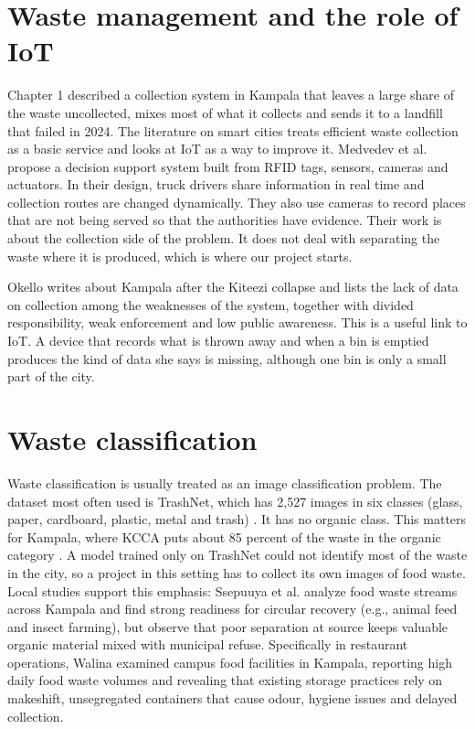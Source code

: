 \documentclass[12pt,a4paper]{report}
\begin{document}
\section{Waste management and the role of IoT}

Chapter 1 described a collection system in Kampala that leaves a large share of the waste uncollected, mixes most of what it collects and sends it to a landfill that failed in 2024. The literature on smart cities treats efficient waste collection as a basic service and looks at IoT as a way to improve it. Medvedev et al. \cite{medvedev} propose a decision support system built from RFID tags, sensors, cameras and actuators. In their design, truck drivers share information in real time and collection routes are changed dynamically. They also use cameras to record places that are not being served so that the authorities have evidence. Their work is about the collection side of the problem. It does not deal with separating the waste where it is produced, which is where our project starts.

Okello \cite{okello} writes about Kampala after the Kiteezi collapse and lists the lack of data on collection among the weaknesses of the system, together with divided responsibility, weak enforcement and low public awareness. This is a useful link to IoT. A device that records what is thrown away and when a bin is emptied produces the kind of data she says is missing, although one bin is only a small part of the city.

\section{Waste classification}

Waste classification is usually treated as an image classification problem. The dataset most often used is TrashNet, which has 2,527 images in six classes (glass, paper, cardboard, plastic, metal and trash) \cite{yang,white}. It has no organic class. This matters for Kampala, where KCCA puts about 85 percent of the waste in the organic category \cite{kcca2026}. A model trained only on TrashNet could not identify most of the waste in the city, so a project in this setting has to collect its own images of food waste. Local studies support this emphasis: Ssepuuya et al. \cite{ssepuuya} analyze food waste streams across Kampala and find strong readiness for circular recovery (e.g., animal feed and insect farming), but observe that poor separation at source keeps valuable organic material mixed with municipal refuse. Specifically in restaurant operations, Walina \cite{walina} examined campus food facilities in Kampala, reporting high daily food waste volumes and revealing that existing storage practices rely on makeshift, unsegregated containers that cause odour, hygiene issues and delayed collection.
\end{document}
